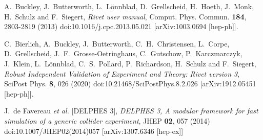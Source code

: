 \documentclass[12pt]{book}
\begin{document}
\begin{thebibliography}{19}
A.~Buckley, J.~Butterworth, L.~L\"onnblad, D.~Grellscheid, H.~Hoeth, J.~Monk, H.~Schulz and F.~Siegert,
{\em Rivet user manual},
Comput. Phys. Commun. \textbf{184}, 2803-2819 (2013)
doi:10.1016/j.cpc.2013.05.021
[arXiv:1003.0694 [hep-ph]].

C.~Bierlich, A.~Buckley, J.~Butterworth, C.~H.~Christensen, L.~Corpe,
D.~Grellscheid, J.~F.~Grosse-Oetringhaus, C.~Gutschow,
P.~Karczmarczyk, J.~Klein, L.~L\"onnblad, C.~S.~Pollard, P.~Richardson,
H.~Schulz and F.~Siegert,
{\em Robust Independent Validation of Experiment and Theory: Rivet
  version 3},
SciPost Phys. \textbf{8}, 026 (2020)
doi:10.21468/SciPostPhys.8.2.026
[arXiv:1912.05451 [hep-ph]].

J.~de Favereau \textit{et al.} [DELPHES 3],
{\em DELPHES 3, A modular framework for fast simulation of a generic
  collider experiment},
JHEP \textbf{02}, 057 (2014)
doi:10.1007/JHEP02(2014)057
[arXiv:1307.6346 [hep-ex]]

\end{thebibliography}
\end{document}
